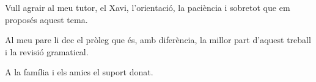 Vull agrair al meu tutor, el Xavi, l'orientació, la paciència i sobretot que em proposés aquest tema.

Al meu pare li dec el pròleg que és, amb diferència, la millor part d'aquest treball i la revisió gramatical.

A la família i els amics el suport donat.